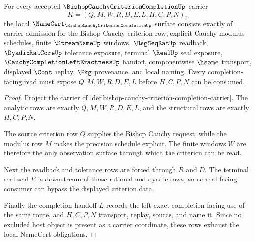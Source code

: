 \begin{theorem}
\label{thm:bishop-cauchy-criterion-completion-namecert-obligations}
For every accepted $\BishopCauchyCriterionCompletionUp$ carrier
$$
K=(Q,M,W,R,D,E,L,H,C,P,N),
$$
the local $\NameCert_{\BishopCauchyCriterionCompletionUp}$ surface consists exactly of carrier admission for the Bishop Cauchy criterion row, explicit Cauchy modulus schedules, finite $\StreamNameUp$ windows, $\RegSeqRatUp$ readback, $\DyadicRatCoreUp$ tolerance exposure, terminal $\RealUp$ seal exposure, $\CauchyCompletionLeftExactnessUp$ handoff, componentwise $\hsame$ transport, displayed $\Cont$ replay, $\Pkg$ provenance, and local naming. Every completion-facing read must expose $Q,M,W,R,D,E,L$ before $H,C,P,N$ can be consumed.
\end{theorem}
\begin{proof}
Project the carrier of \autoref{def:bishop-cauchy-criterion-completion-carrier}. The analytic rows are exactly $Q,M,W,R,D,E,L$, and the structural rows are exactly $H,C,P,N$.

The source criterion row $Q$ supplies the Bishop Cauchy request, while the modulus row $M$ makes the precision schedule explicit. The finite windows $W$ are therefore the only observation surface through which the criterion can be read.

Next the readback and tolerance rows are forced through $R$ and $D$. The terminal real seal $E$ is downstream of those rational and dyadic rows, so no real-facing consumer can bypass the displayed criterion data.

Finally the completion handoff $L$ records the left-exact completion-facing use of the same route, and $H,C,P,N$ transport, replay, source, and name it. Since no excluded host object is present as a carrier coordinate, these rows exhaust the local NameCert obligations.
\end{proof}


